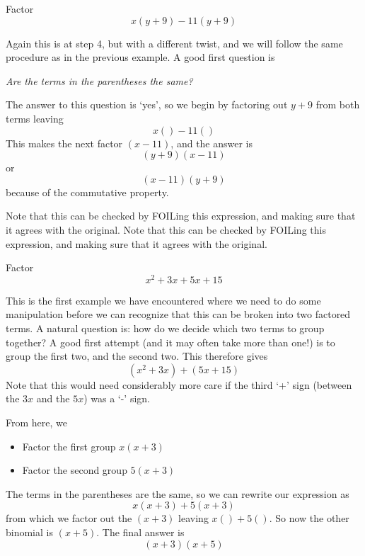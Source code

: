 \begin{myexample}
Factor
\[
	x(y+9)-11(y+9)
\]
{}
\end{myexample}
\begin{myProof}
	Again this is at step 4, but with a different twist, and we will follow the same procedure as in 
	the previous example. A good first question is
	\begin{tightcenter}{\em Are the terms in the parentheses the same?}\end{tightcenter}
	The answer to this question is `yes', so we begin by factoring out $y+9$ from both terms leaving
	\[
		x()-11()
	\] 
	This makes the next factor $(x-11)$, and the answer is
	\[
		(y+9)(x-11)
	\]
	or
	\[
		(x-11)(y+9)
	\]
	because of the commutative property.
			
	Note that this can be checked by FOILing this expression, and making sure that it agrees with the original. Note that this can be checked by FOILing this expression, and making sure that it agrees with the original.
\end{myProof} 

\begin{myexample}
Factor
\[
	x^2+3x+5x+15
\]
\end{myexample}
\begin{myProof}
	This is the first example we have encountered where we need to do some manipulation before we can recognize that
	this can be broken into two factored terms. A natural question is: how do we decide which two terms to group together? A good first attempt (and it may often take more than one!)
	is to group the first two, and the second two. This therefore gives
	\[
		(x^2+3x)+(5x+15)
	\]
	Note that this would need considerably more care if the third `+' sign (between the $3x$ and the $5x$) was a `-'
	sign. 
			
	From here, we
	\begin{itemize}
		\item Factor the first group $x(x+3)$
		\item Factor the second group $5(x+3)$
	\end{itemize} 
	The terms in the parentheses are the same, so we can rewrite our expression as
	\[
		x(x+3)+5(x+3)
	\]
	from which we factor out the $(x+3)$ leaving $x()+5()$. So now the other binomial is
	$(x+5)$. The final answer is
	\[
		(x+3)(x+5)
	\]
\end{myProof} 

